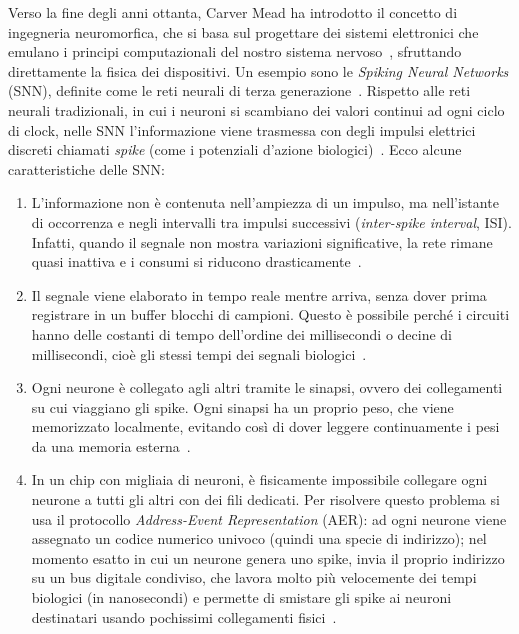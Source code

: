 Verso la fine degli anni ottanta, Carver Mead ha introdotto il concetto di ingegneria neuromorfica, che si basa sul progettare dei sistemi elettronici che emulano i principi computazionali del nostro sistema nervoso~\cite{indiveri2011}, sfruttando direttamente la fisica dei dispositivi. Un esempio sono le \emph{Spiking Neural Networks} (SNN), definite come le reti neurali di terza generazione~\cite{li2024}. Rispetto alle reti neurali tradizionali, in cui i neuroni si scambiano dei valori continui ad ogni ciclo di clock, nelle SNN l'informazione viene trasmessa con degli impulsi elettrici discreti chiamati \emph{spike} (come i potenziali d'azione biologici)~\cite{indiveri2011, li2024}. Ecco alcune caratteristiche delle SNN:
\begin{enumerate}
  \item L'informazione non è contenuta nell'ampiezza di un impulso, ma nell'istante di occorrenza e negli intervalli tra impulsi successivi (\emph{inter-spike interval}, ISI). Infatti, quando il segnale non mostra variazioni significative, la rete rimane quasi inattiva e i consumi si riducono drasticamente~\cite{indiveri2011, ronchini2023, bartels2025}.
  \item Il segnale viene elaborato in tempo reale mentre arriva, senza dover prima registrare in un buffer blocchi di campioni. Questo è possibile perché i circuiti hanno delle costanti di tempo dell'ordine dei millisecondi o decine di millisecondi, cioè gli stessi tempi dei segnali biologici~\cite{qiao2015, bartels2025}.
  \item Ogni neurone è collegato agli altri tramite le sinapsi, ovvero dei collegamenti su cui viaggiano gli spike. Ogni sinapsi ha un proprio peso, che viene memorizzato localmente, evitando così di dover leggere continuamente i pesi da una memoria esterna~\cite{qiao2015, moradi2018}.
  \item In un chip con migliaia di neuroni, è fisicamente impossibile collegare ogni neurone a tutti gli altri con dei fili dedicati. Per risolvere questo problema si usa il protocollo \emph{Address-Event Representation} (AER): ad ogni neurone viene assegnato un codice numerico univoco (quindi una specie di indirizzo); nel momento esatto in cui un neurone genera uno spike, invia il proprio indirizzo su un bus digitale condiviso, che lavora molto più velocemente dei tempi biologici (in nanosecondi) e permette di smistare gli spike ai neuroni destinatari usando pochissimi collegamenti fisici~\cite{indiveri2011, moradi2018}.
\end{enumerate}

